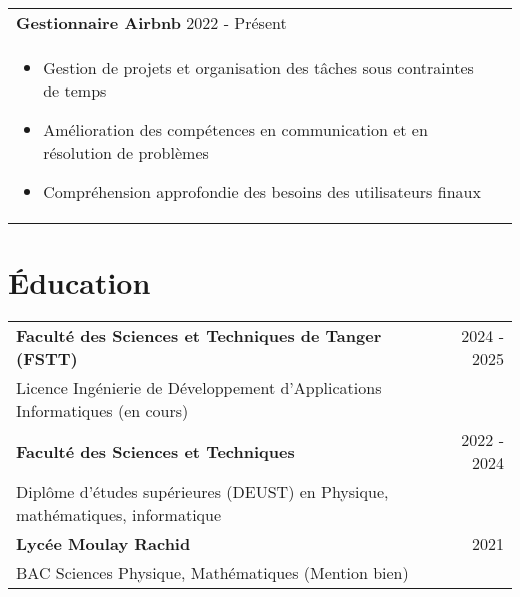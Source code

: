 \documentclass[a4paper,8pt]{article}
\begin{document}
\begin{tabularx}{\linewidth}{ @{}l r@{} }
\color[HTML]{1C033C} \textbf{{Gestionnaire Airbnb}} \hfill \color[HTML]{371e77} 2022 - Présent \\[4pt]
\begin{minipage}[t]{\linewidth}
    \begin{itemize}[nosep,after=\strut, leftmargin=2em, itemsep=2pt]
        \item Gestion de projets et organisation des tâches sous contraintes de temps
        \item Amélioration des compétences en communication et en résolution de problèmes
        \item Compréhension approfondie des besoins des utilisateurs finaux
    \end{itemize}
\end{minipage}
\end{tabularx}

\section{Éducation}
\begin{tabularx}{\linewidth}{ @{}l r@{} }
\color[HTML]{1C033C} \textbf{Faculté des Sciences et Techniques de Tanger (FSTT)} & \hfill \color[HTML]{371e77} 2024 - 2025 \\
\color[HTML]{371e77} Licence Ingénierie de Développement d'Applications Informatiques (en cours) & \hfill \color[HTML]{4B28A4} \\[5pt]
\color[HTML]{1C033C} \textbf{Faculté des Sciences et Techniques} & \hfill \color[HTML]{371e77} 2022 - 2024 \\
\color[HTML]{371e77} Diplôme d'études supérieures (DEUST) en Physique, mathématiques, informatique & \hfill \color[HTML]{4B28A4} \\[5pt]
\color[HTML]{1C033C} \textbf{Lycée Moulay Rachid} & \hfill \color[HTML]{371e77} 2021 \\
\color[HTML]{371e77} BAC Sciences Physique, Mathématiques (Mention bien) & \hfill \color[HTML]{4B28A4}
\end{tabularx}

\end{document}
